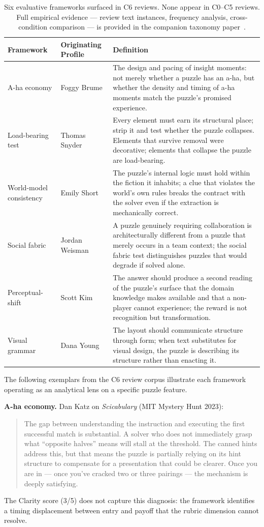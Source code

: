 \begin{table}[h]
\centering
\caption{Six evaluative frameworks surfaced in C6 reviews. None appear in C0--C5 reviews. Full empirical evidence --- review text instances, frequency analysis, cross-condition comparison --- is provided in the companion taxonomy paper~\cite{paper3taxonomy}.}
\label{tab:taxonomy}
\begin{tabular}{p{2.8cm}p{2.4cm}p{6.6cm}}
\toprule
Framework & Originating Profile & Definition \\
\midrule
A-ha economy & Foggy Brume & The design and pacing of insight moments: not merely whether a puzzle has an a-ha, but whether the density and timing of a-ha moments match the puzzle's promised experience. \\[4pt]
Load-bearing test & Thomas Snyder & Every element must earn its structural place; strip it and test whether the puzzle collapses. Elements that survive removal were decorative; elements that collapse the puzzle are load-bearing. \\[4pt]
World-model consistency & Emily Short & The puzzle's internal logic must hold within the fiction it inhabits; a clue that violates the world's own rules breaks the contract with the solver even if the extraction is mechanically correct. \\[4pt]
Social fabric & Jordan Weisman & A puzzle genuinely requiring collaboration is architecturally different from a puzzle that merely occurs in a team context; the social fabric test distinguishes puzzles that would degrade if solved alone. \\[4pt]
Perceptual-shift & Scott Kim & The answer should produce a second reading of the puzzle's surface that the domain knowledge makes available and that a non-player cannot experience; the reward is not recognition but transformation. \\[4pt]
Visual grammar & Dana Young & The layout should communicate structure through form; when text substitutes for visual design, the puzzle is describing its structure rather than enacting it. \\
\bottomrule
\end{tabular}
\end{table}

The following exemplars from the C6 review corpus illustrate each framework operating as an analytical lens on a specific puzzle feature.

\textbf{A-ha economy.} Dan Katz on \textit{Scicabulary} (MIT Mystery Hunt 2023):
\begin{quote}
The gap between understanding the instruction and executing the first successful match is substantial. A solver who does not immediately grasp what ``opposite halves'' means will stall at the threshold. The canned hints address this, but that means the puzzle is partially relying on its hint structure to compensate for a presentation that could be clearer. Once you are in --- once you've cracked two or three pairings --- the mechanism is deeply satisfying.
\end{quote}
The Clarity score (3/5) does not capture this diagnosis: the framework identifies a timing displacement between entry and payoff that the rubric dimension cannot resolve.

